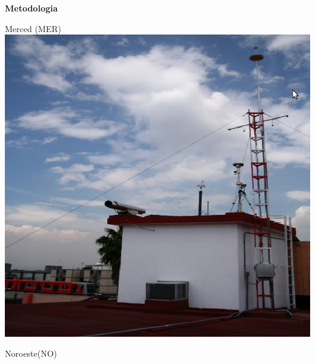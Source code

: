 \documentclass{article}
\begin{document}
\begin{minipage}{0.53\linewidth}
\vspace{-0.16cm}
\begin{center}
\begin{shaded}
\textbf{\textcolor{ver}{Metodologia}}
\end{shaded}
\vspace{-0.7cm}
\end{center}
\begin{minipage}{0.5\linewidth}
\begin{center}
\colorbox{ner}{\changefontsizes{9pt} \hspace{3.07cm}Merced (MER)\hspace{3.07cm}\vspace{0.3cm}}\vspace{0.2cm}\\
\includegraphics[scale=0.745]{images/mer.eps}
\end{center}
\end{minipage}
\hspace{0.1cm}
\begin{minipage}{0.23\linewidth}
\colorbox{ner}{\changefontsizes{9pt} \hspace{0.3cm} Noroeste(NO) \hspace{0.3cm}}

\end{minipage}
\end{minipage}
\end{document}
